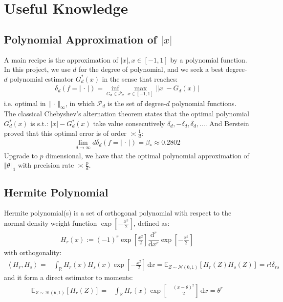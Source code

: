 \documentclass[11pt,a4paper]{article}
\numberwithin{equation}{section}%
\begin{document}
\section{Useful Knowledge}

\subsection{Polynomial Approximation of $ \left\vert x  \right\vert  $}\label{sec:polyapprox}

A main recipe is the approximation of $ \left\vert x \right\vert , x\in [-1,1] $ by a polynomial function. In this project, we use $ d $ for the degree of polynomial, and we seek a best degree-$ d $ polynomial estimator $ G_d^*(x) $ in the sense that reaches:
\begin{align*}
    \delta _d(f=\left\vert \, \cdot \,  \right\vert )=\mathop{ \inf }\limits_{G_d\in \mathcal{P}_d} \mathop{ \max }\limits_{x\in [-1,1]} \big\vert \left\vert x \right\vert - G_d(x) \big\vert 
\end{align*}
i.e. optimal in $ \left\Vert \, \cdot \,  \right\Vert _\infty $, in which $ \mathcal{P}_d $ is the set of degree-$ d $ polynomial functions. The classical Chebyshev's alternation theorem \cite{cai2011testing} states that the optimal polynomial $ G_d^*(x) $ is s.t.: $ \left\vert x \right\vert - G_d^*(x) $ take value consecutively $ \delta _d,-\delta _d, \delta _d,\ldots $. And Berstein \cite{bernstein1914meilleure} proved that this optimal error is of order $ \asymp \frac{1}{d} $:
\begin{align*}
    \lim_{d\to \infty }d\delta _d(f=\left\vert \, \cdot \,  \right\vert )=\beta _*\approx 0.2802\tag{Berstein's constant}
\end{align*}
Upgrade to $ p $ dimensional, we have that the optimal polynomial approximation of $\left\Vert \theta  \right\Vert _1 $ with precision rate $ \asymp \frac{p}{d} $.



\subsection{Hermite Polynomial}

Hermite polynomial(s) is a set of orthogonal polynomial with respect to the normal density weight function $ \exp\left[ -\frac{ x^2}{ 2 }  \right]  $, defined as:
\begin{align*}
    H_r(x) :=(-1)^r\exp\left[ \frac{ x^2}{ 2 }  \right] \dfrac{ \mathrm{d}^r }{ \mathrm{d}x^r }\exp\left[ -\frac{ x^2}{ 2 }  \right]
\end{align*}
with orthogonality:
\begin{align*}
    \left\langle H_r, H_s \right\rangle =&\int _\mathbb{R} H_r(x)H_s(x)\exp\left[ -\frac{ x^2}{ 2 }  \right] \,\mathrm{d}x = \mathbb{E}_{ Z\sim \mathcal{N}(0,1) }\left[ H_r(Z)H_s(Z) \right]  = r!\delta _{rs}
\end{align*}
and it form a direct estimator to moments:
\begin{align*}
    \mathbb{E}_{ Z\sim \mathcal{N}(\theta ,1) }\left[ H_r(Z) \right] =&\int _\mathbb{R} H_r(x)\exp\left[ -\frac{ (x-\theta)^2}{ 2 }  \right] \,\mathrm{d}x = \theta ^r
\end{align*}
\end{document}
